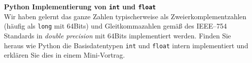 \textbf{Python Implementierung von \texttt{int} und \texttt{float}}\\
Wir haben gelernt das ganze Zahlen typischerweise als Zweierkomplementzahlen (häufig als \texttt{long} mit 64Bits) und Gleitkommazahlen gemäß des IEEE--754 Standards in \textit{double precision} mit 64Bits implementiert werden. Finden Sie heraus wie Python die Basisdatentypen \texttt{int} und \texttt{float} intern implementiert und erklären Sie dies in einem Mini-Vortrag.